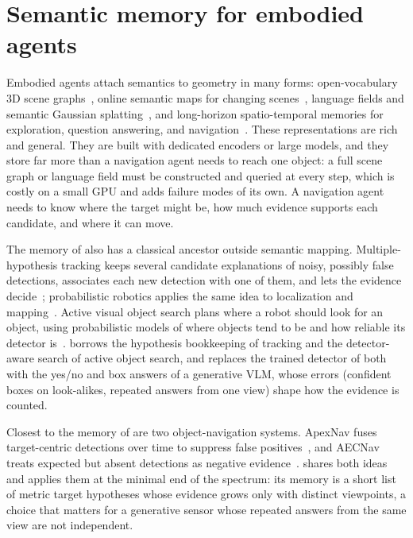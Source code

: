\section{Semantic memory for embodied agents}
\label{sec:lit-memory}
Embodied agents attach semantics to geometry in many forms: open-vocabulary 3D scene graphs~\cite{gu2023conceptgraphs},
online semantic maps for changing scenes~\cite{jiang2025dualmap}, language fields and semantic Gaussian
splatting~\cite{katragadda2025online,lee2026embodiedsplat}, and long-horizon spatio-temporal memories for exploration,
question answering, and navigation~\cite{yang2024scene,anwar2024remembr,ginting2025enter}. These representations
are rich and general. They are built with dedicated encoders or large models, and they store far more than a
navigation agent needs to reach one object: a full scene graph or language field must be constructed and queried
at every step, which is costly on a small GPU and adds failure modes of its own. A navigation agent needs to know
where the target might be, how much evidence supports each candidate, and where it can move.

The memory of \ours also has a classical ancestor outside semantic mapping. Multiple-hypothesis
tracking keeps several candidate explanations of noisy, possibly false detections, associates each new detection
with one of them, and lets the evidence decide~\cite{reid1979algorithm}; probabilistic robotics applies the same
idea to localization and mapping~\cite{thrun2005probabilistic}. Active visual object search plans where a robot should
look for an object, using probabilistic models of where objects tend to be and how reliable its detector
is~\cite{aydemir2011search,aydemir2013active}. \ours borrows the hypothesis bookkeeping of tracking and the
detector-aware search of active object search, and replaces the trained detector of both with the yes/no and box
answers of a generative VLM, whose errors (confident boxes on look-alikes, repeated answers from one view) shape how
the evidence is counted.

Closest to the memory of \ours are two object-navigation systems. ApexNav fuses target-centric detections over time
to suppress false positives~\cite{zhang2025apexnav}, and AECNav treats expected but absent detections as negative
evidence~\cite{liu2026aecnav}. \ours shares both ideas and applies them at the minimal end of the spectrum: its memory
is a short list of metric target hypotheses whose evidence grows only with distinct viewpoints, a choice that
matters for a generative sensor whose repeated answers from the same view are not independent.

